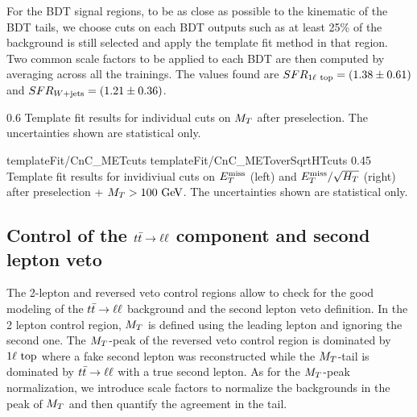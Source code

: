     For the BDT signal regions, to be as close as possible to the kinematic of the BDT tails,
    we choose cuts on each BDT outputs such as at least 25\% of the background is still
    selected and apply the template fit method in that region. Two common scale factors
    to be applied to each BDT are then computed by averaging across all the trainings.
    The values found are $SFR_{1\ell~\text{top}} = (1.38 \pm 0.61)$ and $SFR_{\text{$W$+jets}} = (1.21 \pm 0.36)$.

                     {0.6}
                     {Template fit results for individual cuts on $M_T$ after
                     preselection. The uncertainties shown are statistical only.}

                         {templateFit/CnC_METcuts}
                         {templateFit/CnC_METoverSqrtHTcuts}
                         {0.45}
                         {Template fit results for invidiviual cuts on $E_T^\text{miss}$ (left)
                         and $E_T^\text{miss}/\sqrt{H_T}$ (right) after preselection + $M_T > 100~\text{GeV}$.
                         The uncertainties shown are statistical only.}

        \subsection{Control of the $t\bar{t} \rightarrow \ell \ell$ component and second lepton veto \label{sec:analysis_controlDileptonTop}}

        The 2-lepton and reversed veto control regions allow to check for the good modeling
        of the $t\bar{t} \rightarrow \ell \ell$ background and the second lepton veto definition. In the
        2 lepton control region, $M_T$ is defined using the leading lepton and ignoring
        the second one. The $M_T$-peak of the reversed veto control region is dominated by
        $1\ell~\text{top}$ where a fake second lepton was reconstructed while the $M_T$-tail
        is dominated by $t\bar{t} \rightarrow \ell \ell$ with a true second lepton. As for the $M_T$-peak
        normalization, we introduce scale factors to normalize the backgrounds in the peak
        of $M_T$ and then quantify the agreement in the tail.

